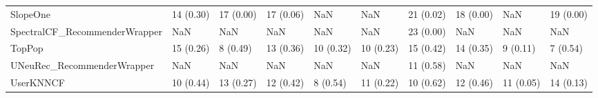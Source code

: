 \begin{tabular}{llllllllll}
                           SlopeOne &                14 (0.30) &   17 (0.00) &     17 (0.06) &          NaN &                  NaN &           21 (0.02) &         18 (0.00) &                NaN &         19 (0.00) \\
      SpectralCF\_RecommenderWrapper &                      NaN &         NaN &           NaN &          NaN &                  NaN &           23 (0.00) &               NaN &                NaN &               NaN \\
                             TopPop &                15 (0.26) &    8 (0.49) &     13 (0.36) &    10 (0.32) &            10 (0.23) &           15 (0.42) &         14 (0.35) &           9 (0.11) &          7 (0.54) \\
         UNeuRec\_RecommenderWrapper &                      NaN &         NaN &           NaN &          NaN &                  NaN &           11 (0.58) &               NaN &                NaN &               NaN \\
                          UserKNNCF &                10 (0.44) &   13 (0.27) &     12 (0.42) &     8 (0.54) &            11 (0.22) &           10 (0.62) &         12 (0.46) &          11 (0.05) &         14 (0.13) \\
\bottomrule
\end{tabular}
